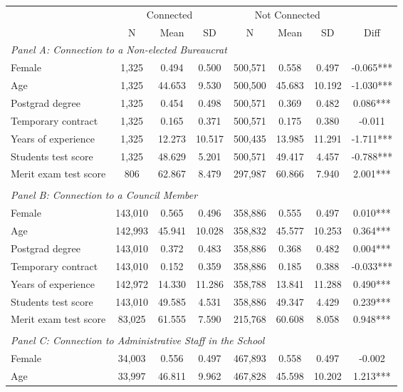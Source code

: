 \begin{tabular}{lccccccc}
\hline  & \multicolumn{3}{c}{Connected} & \multicolumn{3}{c}{Not Connected} & \\
 & N & Mean & SD & N & Mean & SD & Diff\\
\hline \multicolumn{8}{l}{\textit{Panel A: Connection to a Non-elected Bureaucrat}} \\
Female & 1,325 & 0.494 & 0.500 & 500,571 & 0.558 & 0.497 & -0.065***\\
Age & 1,325 & 44.653 & 9.530 & 500,500 & 45.683 & 10.192 & -1.030***\\
Postgrad degree & 1,325 & 0.454 & 0.498 & 500,571 & 0.369 & 0.482 & 0.086***\\
Temporary contract & 1,325 & 0.165 & 0.371 & 500,571 & 0.175 & 0.380 & -0.011\\
Years of experience & 1,325 & 12.273 & 10.517 & 500,435 & 13.985 & 11.291 & -1.711***\\
Students test score & 1,325 & 48.629 & 5.201 & 500,571 & 49.417 & 4.457 & -0.788***\\
Merit exam test score & 806 & 62.867 & 8.479 & 297,987 & 60.866 & 7.940 & 2.001***\\
\\
 \multicolumn{8}{l}{\textit{Panel B: Connection to a Council Member}} \\
Female & 143,010 & 0.565 & 0.496 & 358,886 & 0.555 & 0.497 & 0.010***\\
Age & 142,993 & 45.941 & 10.028 & 358,832 & 45.577 & 10.253 & 0.364***\\
Postgrad degree & 143,010 & 0.372 & 0.483 & 358,886 & 0.368 & 0.482 & 0.004***\\
Temporary contract & 143,010 & 0.152 & 0.359 & 358,886 & 0.185 & 0.388 & -0.033***\\
Years of experience & 142,972 & 14.330 & 11.286 & 358,788 & 13.841 & 11.288 & 0.490***\\
Students test score & 143,010 & 49.585 & 4.531 & 358,886 & 49.347 & 4.429 & 0.239***\\
Merit exam test score & 83,025 & 61.555 & 7.590 & 215,768 & 60.608 & 8.058 & 0.948***\\
\\
\multicolumn{8}{l}{\textit{Panel C: Connection to Administrative Staff in the School}} \\
 Female & 34,003 & 0.556 & 0.497 & 467,893 & 0.558 & 0.497 & -0.002\\
Age & 33,997 & 46.811 & 9.962 & 467,828 & 45.598 & 10.202 & 1.213***\\

\end{tabular}
